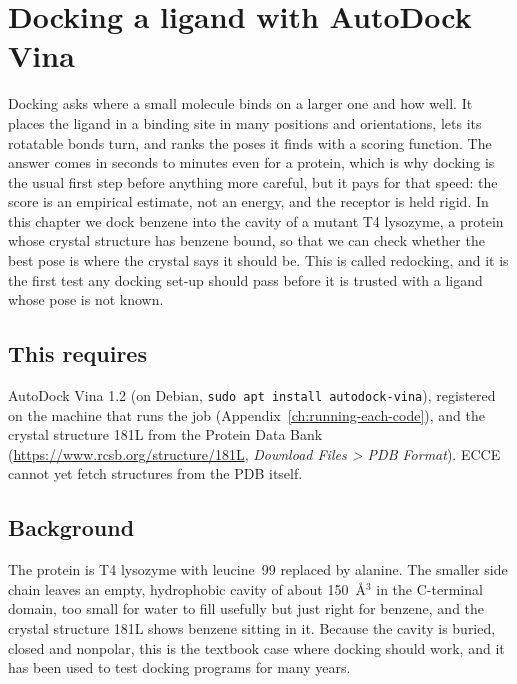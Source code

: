 \chapter{Docking a ligand with AutoDock Vina}
\label{ch:docking}

Docking asks where a small molecule binds on a larger one and how well. It places the ligand in a binding site in many positions and orientations, lets its rotatable bonds turn, and ranks the poses it finds with a scoring function. The answer comes in seconds to minutes even for a protein, which is why docking is the usual first step before anything more careful, but it pays for that speed: the score is an empirical estimate, not an energy, and the receptor is held rigid. In this chapter we dock benzene into the cavity of a mutant T4 lysozyme, a protein whose crystal structure has benzene bound, so that we can check whether the best pose is where the crystal says it should be. This is called redocking, and it is the first test any docking set-up should pass before it is trusted with a ligand whose pose is not known.

\section*{This requires}
AutoDock Vina 1.2 (on Debian, \texttt{sudo apt install autodock-vina}), registered on the machine that runs the job (Appendix~\ref{ch:running-each-code}), and the crystal structure 181L from the Protein Data Bank (\url{https://www.rcsb.org/structure/181L}, \emph{Download Files > PDB Format}). ECCE cannot yet fetch structures from the PDB itself.

\section{Background}
The protein is T4 lysozyme with leucine~99 replaced by alanine. The smaller side chain leaves an empty, hydrophobic cavity of about 150~\AA$^3$ in the C-terminal domain, too small for water to fill usefully but just right for benzene, and the crystal structure 181L shows benzene sitting in it. Because the cavity is buried, closed and nonpolar, this is the textbook case where docking should work, and it has been used to test docking programs for many years.

